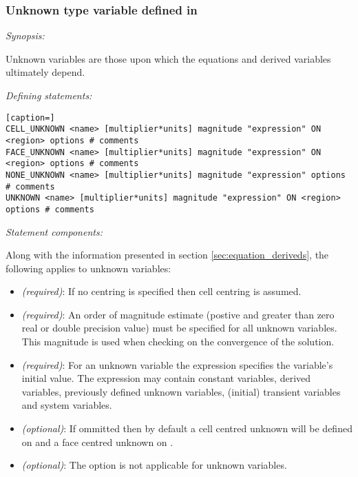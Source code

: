 \subsubsection{Unknown type variable defined in }

\emph{Synopsis:}

Unknown variables are those upon which the equations and derived variables ultimately depend.

\emph{Defining statements:}

\begin{lstlisting}[caption=]
CELL_UNKNOWN <name> [multiplier*units] magnitude "expression" ON <region> options # comments
FACE_UNKNOWN <name> [multiplier*units] magnitude "expression" ON <region> options # comments
NONE_UNKNOWN <name> [multiplier*units] magnitude "expression" options # comments
UNKNOWN <name> [multiplier*units] magnitude "expression" ON <region> options # comments
\end{lstlisting}

\emph{Statement components:}

Along with the information presented in section \ref{sec:equation_deriveds}, the following applies to unknown variables:

\begin{itemize}
\item {} \emph{(required)}:  If no centring is specified then cell centring is assumed.
\item {} \emph{(required)}:  An order of magnitude estimate (postive and greater than zero real or double precision value) must be specified for all unknown variables.  This magnitude is used when checking on the convergence of the solution.
\item {} \emph{(required)}:  For an unknown variable the expression specifies the variable's initial value.  The expression may contain constant variables, derived variables, previously defined unknown variables, (initial) transient variables and system variables.
\item {} \emph{(optional)}:  If ommitted then by default a cell centred unknown will be defined on  and a face centred unknown on .
\item {} \emph{(optional)}:  The  option is not applicable for unknown variables.
\end{itemize}

